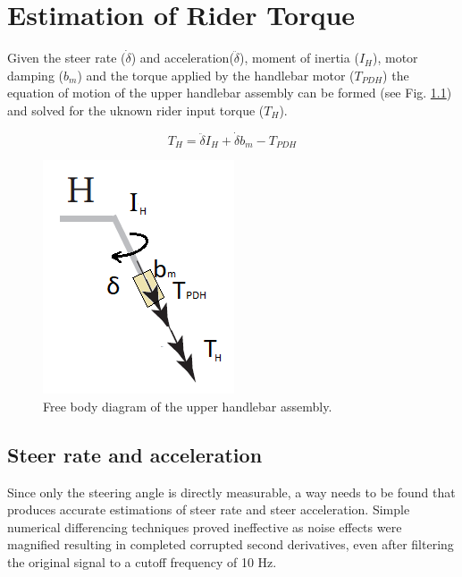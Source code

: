 \chapter{Estimation of Rider Torque}

Given  the steer rate (\ensuremath{\dot{\delta}}) and acceleration(\ensuremath{\ddot{\delta}}), moment of inertia (\ensuremath{I_H}), motor damping  (\ensuremath{b_m}) and the torque applied by the handlebar motor (\ensuremath{T_{PDH}}) the equation of motion of the upper handlebar assembly can be formed (see Fig. \ref{fig:free_handle}) and solved for the uknown rider input torque (\ensuremath{T_H}).

\begin{equation}
    T_{H}= \ddot{\delta}I_H+\dot{\delta}b_{m} -T_{PDH} 
    \label{eq:torque_rider}
\end{equation}
\begin{figure}[h]
    \centering 
    \captionsetup{justification=centering,margin=2cm}

    \captionsetup{justification=centering,margin=2cm}
    \includegraphics[scale=0.9]{images/free_handle.png}
    \caption[Short title]{Free body diagram of the upper handlebar assembly. }
    \label{fig:free_handle}
\end{figure}

\section{Steer rate and acceleration} \label{sec:rateAccel}
Since only the steering angle is directly measurable, a way needs to be found that produces accurate estimations of steer rate and steer acceleration. Simple numerical differencing techniques proved ineffective as noise effects were magnified resulting in completed corrupted second derivatives, even after filtering the original signal to a cutoff frequency of 10 Hz. 

